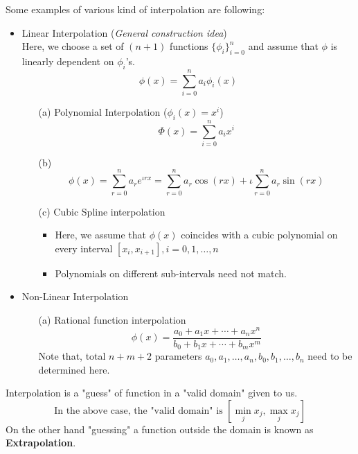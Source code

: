 \begin{example}
	Some examples of various kind of interpolation are following:
	\begin{itemize}
		\item Linear Interpolation (\textit{General construction idea})
		      \\ Here, we choose a set of $(n+1)$ functions $ \{\phi_i\}_{i=0}^n $ and assume that $\phi$ is linearly dependent on $\phi_i$'s.
		      \[
			      \phi(x) = \sum_{i=0}^{n}a_i\phi_i(x)
		      \]
		      \begin{itemize}
			      \item[(a)] Polynomial Interpolation ($ \phi_i(x) = x^i $)
				      \[
					      \Phi(x) = \sum_{i=0}^{n}a_ix^i
				      \]
			      \item[(b)] \[\phi(x) = \sum_{r=0}^{n}a_re^{\iota rx} = \sum_{r=0}^{n}a_r\cos(rx) + \iota\sum_{r=0}^{n}a_r\sin(rx) \]
			      \item[(c)] Cubic Spline interpolation
				      \begin{itemize}
					      \item Here, we assume that $ \phi(x) $ coincides with a cubic polynomial on every interval $ [x_i,x_{i+1}], i = 0,1,\ldots,n $
					      \item Polynomials on different sub-intervals need not match.
				      \end{itemize}
		      \end{itemize}
		\item Non-Linear Interpolation
		      \begin{itemize}
				  \item[(a)] Rational function interpolation
			            \[
				            \phi(x) = \frac{a_0+a_1x+\cdots+a_nx^n}{b_0+b_1x+\cdots+b_mx^m}
			            \]
			            Note that, total $ n+m+2 $ parameters $ a_0,a_1,\ldots,a_n,b_0,b_1,\ldots,b_n $ need to be determined here.
		      \end{itemize}
	\end{itemize}

\end{example}

\begin{rmk}
	Interpolation is a "guess" of function in a "valid domain" given to us.
	\[ \text{In the above case, the "valid domain" is  } [\min_j x_j, \max_j x_j] \]
	On the other hand "guessing" a function outside the domain is known as \textbf{Extrapolation}.
\end{rmk}






